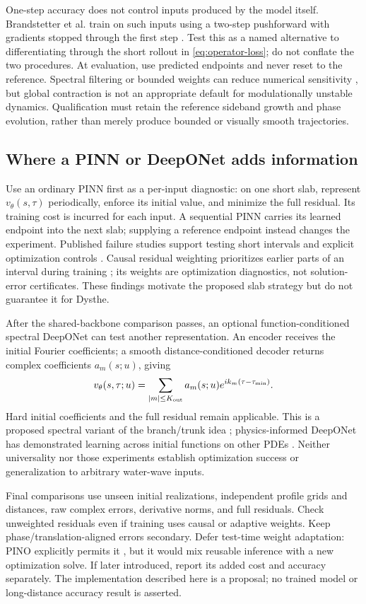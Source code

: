 One-step accuracy does not control inputs produced by the model itself.
Brandstetter et al. train on such inputs using a two-step pushforward
with gradients stopped through the first step \cite[\S3.1]{pushforward}.
Test this as a named alternative to differentiating through the short
rollout in \eqref{eq:operator-loss}; do not conflate the two procedures.
At evaluation, use predicted endpoints and never reset to the reference.
Spectral filtering or bounded weights can reduce numerical sensitivity
\cite[\S4]{stability}, but global contraction is not an appropriate
default for modulationally unstable dynamics.  Qualification must
retain the reference sideband growth and phase evolution, rather than
merely produce bounded or visually smooth trajectories.

\subsection{Where a PINN or DeepONet adds information}

Use an ordinary PINN first as a per-input diagnostic: on one short slab,
represent $v_\theta(s,\tau)$ periodically, enforce its initial value,
and minimize the full residual.  Its training cost is incurred for
each input.  A sequential PINN carries its learned endpoint into the
next slab; supplying a reference endpoint instead changes the experiment.
Published failure studies support testing short intervals and explicit
optimization controls \cite[\S5]{failures}.  Causal residual weighting
prioritizes earlier parts of an interval during training
\cite[\S3]{causal}; its weights are optimization diagnostics, not
solution-error certificates.  These findings motivate the proposed
slab strategy but do not guarantee it for Dysthe.

After the shared-backbone comparison passes, an optional
function-conditioned spectral DeepONet can test another representation.
An encoder receives the initial Fourier coefficients; a smooth
distance-conditioned decoder returns complex coefficients
$a_m(s;u)$, giving
\[
 v_\theta(s,\tau;u)=\sum_{|m|\leq K_{\rm out}}
 a_m(s;u)e^{ik_m(\tau-\tau_{\min})}.
\]
Hard initial coefficients and the full residual remain applicable.
This is a proposed spectral variant of the branch/trunk idea
\cite{deeponet}; physics-informed DeepONet has demonstrated learning
across initial functions on other PDEs \cite{pideeponet}.
Neither universality nor those experiments establish optimization
success or generalization to arbitrary water-wave inputs.

Final comparisons use unseen initial realizations, independent profile
grids and distances, raw complex errors, derivative norms, and full
residuals.  Check unweighted residuals even if training uses causal or
adaptive weights.  Keep phase/translation-aligned errors secondary.
Defer test-time weight adaptation: PINO explicitly permits it
\cite[\S3.2]{pino}, but it would mix reusable inference with a new
optimization solve.  If later introduced, report its added cost and
accuracy separately.  The implementation described here is a proposal;
no trained model or long-distance accuracy result is asserted.
